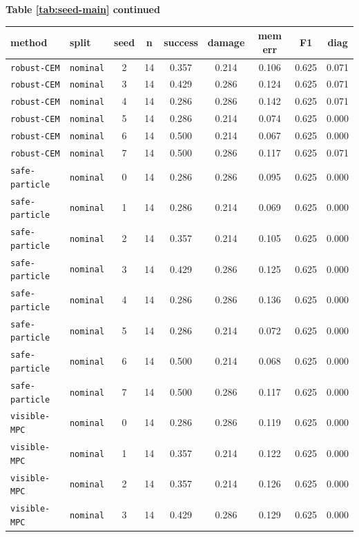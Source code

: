 \documentclass{article}
\begin{document}
\begin{center}
\textbf{Table \ref{tab:seed-main} continued}\\[0.4ex]
\begin{tabular}{llccccccc}
\toprule
method & split & seed & n & success & damage & mem err & F1 & diag \\
\midrule
\texttt{robust-CEM} & \texttt{nominal} & 2 & 14 & 0.357 & 0.214 & 0.106 & 0.625 & 0.071 \\
\texttt{robust-CEM} & \texttt{nominal} & 3 & 14 & 0.429 & 0.286 & 0.124 & 0.625 & 0.071 \\
\texttt{robust-CEM} & \texttt{nominal} & 4 & 14 & 0.286 & 0.286 & 0.142 & 0.625 & 0.071 \\
\texttt{robust-CEM} & \texttt{nominal} & 5 & 14 & 0.286 & 0.214 & 0.074 & 0.625 & 0.000 \\
\texttt{robust-CEM} & \texttt{nominal} & 6 & 14 & 0.500 & 0.214 & 0.067 & 0.625 & 0.000 \\
\texttt{robust-CEM} & \texttt{nominal} & 7 & 14 & 0.500 & 0.286 & 0.117 & 0.625 & 0.071 \\
\texttt{safe-particle} & \texttt{nominal} & 0 & 14 & 0.286 & 0.286 & 0.095 & 0.625 & 0.000 \\
\texttt{safe-particle} & \texttt{nominal} & 1 & 14 & 0.286 & 0.214 & 0.069 & 0.625 & 0.000 \\
\texttt{safe-particle} & \texttt{nominal} & 2 & 14 & 0.357 & 0.214 & 0.105 & 0.625 & 0.000 \\
\texttt{safe-particle} & \texttt{nominal} & 3 & 14 & 0.429 & 0.286 & 0.125 & 0.625 & 0.000 \\
\texttt{safe-particle} & \texttt{nominal} & 4 & 14 & 0.286 & 0.286 & 0.136 & 0.625 & 0.000 \\
\texttt{safe-particle} & \texttt{nominal} & 5 & 14 & 0.286 & 0.214 & 0.072 & 0.625 & 0.000 \\
\texttt{safe-particle} & \texttt{nominal} & 6 & 14 & 0.500 & 0.214 & 0.068 & 0.625 & 0.000 \\
\texttt{safe-particle} & \texttt{nominal} & 7 & 14 & 0.500 & 0.286 & 0.117 & 0.625 & 0.000 \\
\texttt{visible-MPC} & \texttt{nominal} & 0 & 14 & 0.286 & 0.286 & 0.119 & 0.625 & 0.000 \\
\texttt{visible-MPC} & \texttt{nominal} & 1 & 14 & 0.357 & 0.214 & 0.122 & 0.625 & 0.000 \\
\texttt{visible-MPC} & \texttt{nominal} & 2 & 14 & 0.357 & 0.214 & 0.126 & 0.625 & 0.000 \\
\texttt{visible-MPC} & \texttt{nominal} & 3 & 14 & 0.429 & 0.286 & 0.129 & 0.625 & 0.000 \\

\end{tabular}
\end{center}
\end{document}
